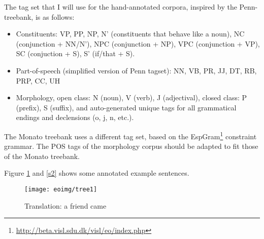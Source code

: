 \documentclass[10pt,a4paper]{article}
\begin{document}
The tag set that I will use for the hand-annotated corpora, 
inspired by the Penn-treebank, is as follows:

\begin{itemize}
\item Constituents: VP, PP, NP, N' (constituents that behave like a noun), 
NC (conjunction + NN/N'), NPC (conjunction + NP), VPC (conjunction + VP), 
SC (conjuction + S), S' (if/that + S). 
\item Part-of-speech (simplified version of Penn tagset): NN, VB, PR, JJ, DT, RB, PRP, CC, UH
\item Morphology, open class: N (noun), V (verb), J (adjectival), 
closed class: P (prefix), S (suffix), and auto-generated unique tags for
all grammatical endings and declensions (o, j, n, etc.).
\end{itemize}

The Monato treebank uses a different tag set, based on the 
EspGram\footnote{\url{http://beta.visl.sdu.dk/visl/eo/index.php}} constraint
grammar. The POS tags of the morphology corpus should be adapted to fit those
of the Monato treebank.

Figure \ref{s1} and \ref{s2} shows some annotated example sentences.


\begin{figure}
\centering
\texttt{[image: eoimg/tree1]}
\caption{Translation: a friend came}
\label{s1}
\end{figure}

\begin{comment}
\begin{verbatim}
(S (S (NP (DT la) (N' (JJ venontajn) (N' (JJ apartajn) (NN pecojn)))) 
(VP (NP (PRP mi)) (VP (VBP donas)))) (S' (IN ke) (S (NP (DT la) (NN lernantoj)) 
(VP (VB povu) (VP (VP (VP (VB ripeti) (RB praktike)) (NP (NP (DT la) (NN regulojn)) 
(PP (IN de) (NP (DT l') (N' (NN gramatiko) (JJ internacia)))))) 
(VPC (CC kaj) (VP (VP (VB kompreni) (RB bone)) (NP (NP (NP (DT la) (NN signifon)) 
(NPC (CC kaj) (NP (DT la) (NN uzon)))) (PP (IN de) 
(NP (DT l') (N' (NN sufiksoj) (NC (CC kaj) (NN prefiksoj)))))))))))))
\end{verbatim}
\end{comment}
\end{document}
